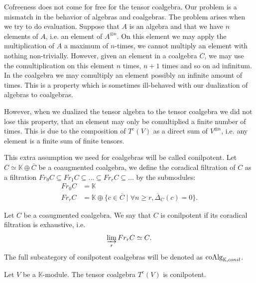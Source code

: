 \documentclass[../thesis.tex]{subfiles}
\begin{document}
            Cofreeness does not come for free for the tensor coalgebra. Our problem is a mismatch in the behavior of algebras and coalgebras. The problem arises when we try to do evaluation. Suppose that $A$ is an algebra and that we have $n$ elements of $A$, i.e. an element of $A^{\otimes n}$. On this element we may apply the multiplication of $A$ a maximum of $n$-times, we cannot multiply an element with nothing non-trivially. However, given an element in a coalgebra $C$, we may use the comultiplication on this element $n$ times, $n+1$ times and so on ad infinitum. In the coalgebra we may comultiply an element possibly an infinite amount of times. This is a property which is sometimes ill-behaved with our dualization of algebras to coalgebras. 
            
            However, when we dualized the tensor algebra to the tensor coalgebra we did not lose this property, that an element may only be comultiplied a finite number of times. This is due to the composition of $T^c(V)$ as a direct sum of $V^{\otimes n}$, i.e. any element is a finite sum of finite tensors.
            
            This extra assumption we need for coalgebras will be called conilpotent. Let $C \simeq \mathbb{K} \oplus \overline{C}$ be a coaugmented coalgebra, we define the coradical filtration of $C$ as a filtration $Fr_0C \subseteq Fr_1C \subseteq ... \subseteq Fr_rC \subseteq ...$ by the submodules:
            \begin{align*}
                Fr_0C & = \mathbb{K} \\
                Fr_rC & = \mathbb{K} \oplus \{c\in\overline{C}\mid \forall n\geq r, \overline{\Delta}_C(c) = 0\}.
            \end{align*}

            \begin{definition}
                Let $C$ be a coaugmented coalgebra. We say that $C$ is conilpotent if its coradical filtration is exhaustive, i.e.
                \begin{align*}
                    \varinjlim_rFr_rC \simeq C\tt{.}
                \end{align*}
                The full subcategory of conilpotent coalgebras will be denoted as $\tt{coAlg}_{\mathbb{K},conil}$.
            \end{definition}
            
            \begin{proposition}\label{prop: conilpotent-tensor}
                Let $V$ be a $\mathbb{K}$-module. The tensor coalgebra $T^c(V)$ is conilpotent.
            \end{proposition}
\end{document}
